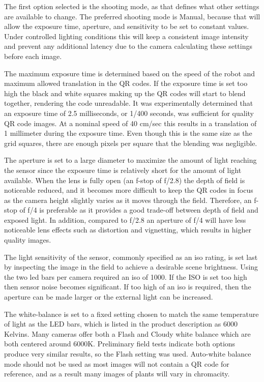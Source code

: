 The first option selected is the shooting mode, as that defines what other settings are available to change.  The preferred shooting mode is Manual, because that will allow the exposure time, aperture, and sensitivity to be set to constant values.  Under controlled lighting conditions this will keep a consistent image intensity and prevent any additional latency due to the camera calculating these settings before each image.

The maximum exposure time is determined based on the speed of the robot and maximum allowed translation in the QR codes.  If the exposure time is set too high the black and white squares making up the QR codes will start to blend together, rendering the code unreadable.  It was experimentally determined that an exposure time of 2.5 milliseconds, or 1/400 seconds, was sufficient for quality QR code images.  At a nominal speed of 40 cm/sec this results in a translation of 1 millimeter during the exposure time.  Even though this is the same size as the grid squares, there are enough pixels per square that the blending was negligible. 

The aperture is set to a large diameter to maximize the amount of light reaching the sensor since the exposure time is relatively short for the amount of light available.  When the lens is fully open (an f-stop of f/2.8) the depth of field is noticeable reduced, and it becomes more difficult to keep the QR codes in focus as the camera height slightly varies as it moves through the field.  Therefore, an f-stop of f/4 is preferable as it provides a good trade-off between depth of field and exposed light.  In addition, compared to f/2.8 an aperture of f/4 will have less noticeable lens effects such as distortion and vignetting, which results in higher quality images.  

The light sensitivity of the sensor, commonly specified as an \ac{iso} rating, is set last by inspecting the image in the field to achieve a desirable scene brightness.  Using the two \ac{led} bars per camera required an \ac{iso} of 1000.  If the ISO is set too high then sensor noise becomes significant.  If too high of an \ac{iso} is required, then the aperture can be made larger or the external light can be increased.  

The white-balance is set to a fixed setting chosen to match the same temperature of light as the LED bars, which is listed in the product description as 6000 Kelvins.  Many cameras offer both a Flash and Cloudy white balance which are both centered around 6000K.   Preliminary field tests indicate both options produce very similar results, so the Flash setting was used.  Auto-white balance mode should not be used as most images will not contain a QR code for reference, and as a result many images of plants will vary in chromacity. 


